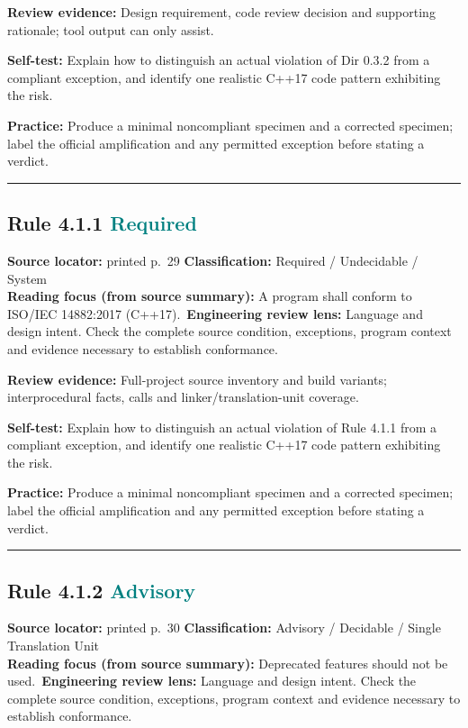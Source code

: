 \documentclass[10pt,letterpaper]{article}
\begin{document}
\textbf{Review evidence:} Design requirement, code review decision and supporting rationale; tool output can only assist.

\textbf{Self-test:} Explain how to distinguish an actual violation of Dir 0.3.2 from a compliant exception, and identify one realistic C++17 code pattern exhibiting the risk.\par
\textbf{Practice:} Produce a minimal noncompliant specimen and a corrected specimen; label the official amplification and any permitted exception before stating a verdict.
\smallskip\hrule\smallskip
\subsection*{Rule 4.1.1 \enspace \texorpdfstring{\small\textcolor{teal}{Required}}{Required}}
\noindent\textbf{Source locator:} printed p.~29 \quad\textbf{Classification:} Required / Undecidable / System\\
\textbf{Reading focus (from source summary):} A program shall conform to ISO/IEC 14882:2017 (C++17).\
\textbf{Engineering review lens:} Language and design intent. Check the complete source condition, exceptions, program context and evidence necessary to establish conformance.

\textbf{Review evidence:} Full-project source inventory and build variants; interprocedural facts, calls and linker/translation-unit coverage.

\textbf{Self-test:} Explain how to distinguish an actual violation of Rule 4.1.1 from a compliant exception, and identify one realistic C++17 code pattern exhibiting the risk.\par
\textbf{Practice:} Produce a minimal noncompliant specimen and a corrected specimen; label the official amplification and any permitted exception before stating a verdict.
\smallskip\hrule\smallskip
\subsection*{Rule 4.1.2 \enspace \texorpdfstring{\small\textcolor{teal}{Advisory}}{Advisory}}
\noindent\textbf{Source locator:} printed p.~30 \quad\textbf{Classification:} Advisory / Decidable / Single Translation Unit\\
\textbf{Reading focus (from source summary):} Deprecated features should not be used.\
\textbf{Engineering review lens:} Language and design intent. Check the complete source condition, exceptions, program context and evidence necessary to establish conformance.
\end{document}
